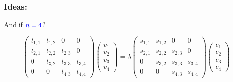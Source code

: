 \documentclass{beamer}
\theoremstyle{definition} \newtheorem{de}{Def}
\theoremstyle{remark} \newtheorem{os}[de]{Remark}
\theoremstyle{plain} \newtheorem{te}[de]{Teo}
\theoremstyle{plain} \newtheorem{co}[de]{Cor}
\theoremstyle{plain} \newtheorem{pr}[de]{Prop}
\theoremstyle{plain} \newtheorem{lem}[de]{Lemm}
\theoremstyle{remark} \newtheorem{rem}[de]{Remark}
\begin{document}
\begin{frame}
  \frametitle{Ideas:}

  And if $\textcolor{blue}{n=4}$?
  
  \begin{equation*}
    \begin{pmatrix}
      t_{1,1} & t_{1,2} & 0 & 0\\
      t_{2,1} & t_{2,2} & t_{2,3} & 0\\
      0 & t_{3,2} & t_{3,3} & t_{3,4}\\
      0 & 0 & t_{4,3} & t_{4,4}
    \end{pmatrix} \begin{pmatrix} 
      v_1 \\ 
      v_2 \\
      v_3 \\
      v_4
    \end{pmatrix} = \lambda \begin{pmatrix}
      s_{1,1} & s_{1,2} & 0 & 0\\
      s_{2,1} & s_{2,2} & s_{2,3} & 0\\
      0 & s_{3,2} & s_{3,3} & s_{3,4}\\
      0 & 0 & s_{4,3} & s_{4,4}
    \end{pmatrix} \begin{pmatrix}
      v_1 \\ 
      v_2 \\
      v_3 \\
      v_4
    \end{pmatrix}
  \end{equation*}

\end{frame}
\end{document}
